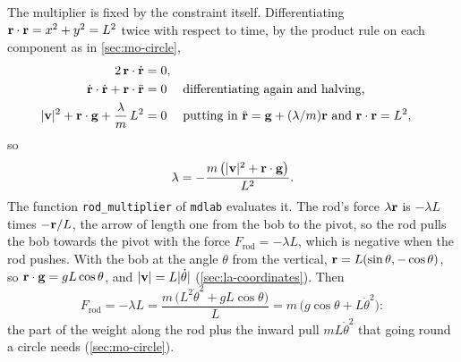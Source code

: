 The multiplier is fixed by the constraint itself. Differentiating
$\bm{\mathrm{r}}\cdot\bm{\mathrm{r}} = x^2 + y^2 = L^2$ twice with respect to time, by the
product rule on each component as in \cref{sec:mo-circle},
\begin{align*}
   2\,\bm{\mathrm{r}}\cdot\dot{\bm{\mathrm{r}}} &= 0 ,\\
   \dot{\bm{\mathrm{r}}}\cdot\dot{\bm{\mathrm{r}}} + \bm{\mathrm{r}}\cdot\ddot{\bm{\mathrm{r}}} &= 0
   && \text{differentiating again and halving,}\\
   \lvert\bm{\mathrm{v}}\rvert^2 + \bm{\mathrm{r}}\cdot\bm{\mathrm{g}} + \frac{\lambda}{m}\,L^2 &= 0
   && \text{putting in $\ddot{\bm{\mathrm{r}}} = \bm{\mathrm{g}} + (\lambda/m)\bm{\mathrm{r}}$ and
      $\bm{\mathrm{r}}\cdot\bm{\mathrm{r}} = L^2$,}
\end{align*}
so
\begin{equation}
   \lambda = -\frac{m\,\bigl(\lvert\bm{\mathrm{v}}\rvert^2 + \bm{\mathrm{r}}\cdot\bm{\mathrm{g}}
   \bigr)}{L^2} .
   \label{eq:la-multiplier}
\end{equation}
The function \texttt{rod\_multiplier} of \texttt{mdlab} evaluates it. The
rod's force $\lambda\bm{\mathrm{r}}$ is $-\lambda L$ times $-\bm{\mathrm{r}}/L$, the arrow of
length one from the bob to the pivot, so the rod pulls the bob towards the
pivot with the force $F_{\mathrm{rod}} = -\lambda L$, which is negative
when the rod pushes. With the bob at the angle $\theta$ from the vertical,
$\bm{\mathrm{r}} = L(\sin\theta, -\cos\theta)$, so $\bm{\mathrm{r}}\cdot\bm{\mathrm{g}} =
gL\cos\theta$, and $\lvert\bm{\mathrm{v}}\rvert = L\lvert\dot\theta\rvert$
(\cref{sec:la-coordinates}). Then
\begin{equation*}
   F_{\mathrm{rod}} = -\lambda L
   = \frac{m\,\bigl(L^2\dot\theta^2 + gL\cos\theta\bigr)}{L}
   = m\,\bigl(g\cos\theta + L\dot\theta^2\bigr) :
\end{equation*}
the part of the weight along the rod plus the inward pull $mL\dot\theta^2$
that going round a circle needs (\cref{sec:mo-circle}).

